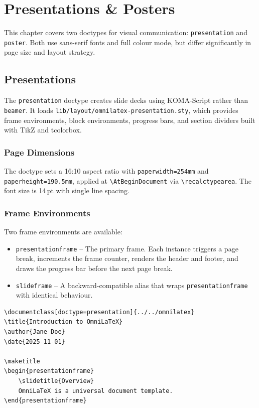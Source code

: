 \chapter{Presentations \& Posters}
\label{ch:visual}

This chapter covers two doctypes for visual communication:
\texttt{presentation} and \texttt{poster}.  Both use sans-serif fonts and
full colour mode, but differ significantly in page size and layout
strategy.

\section{Presentations}
\label{sec:presentation}

The \texttt{presentation} doctype creates slide decks using KOMA-Script
rather than \texttt{beamer}.  It loads
\texttt{lib/layout/omnilatex-presentation.sty}, which provides frame
environments, block environments, progress bars, and section dividers
built with TikZ and tcolorbox.

\subsection{Page Dimensions}

The doctype sets a 16:10 aspect ratio with
\texttt{paperwidth=254mm} and \texttt{paperheight=190.5mm}, applied at
\texttt{\textbackslash AtBeginDocument} via
\texttt{\textbackslash recalctypearea}.  The font size is 14\,pt with
single line spacing.

\subsection{Frame Environments}

Two frame environments are available:

\begin{itemize}
    \item \texttt{presentationframe} -- The primary frame.  Each instance
          triggers a page break, increments the frame counter, renders the
          header and footer, and draws the progress bar before the next
          page break.
    \item \texttt{slideframe} -- A backward-compatible alias that wraps
          \texttt{presentationframe} with identical behaviour.
\end{itemize}

\begin{verbatim}
\documentclass[doctype=presentation]{../../omnilatex}
\title{Introduction to OmniLaTeX}
\author{Jane Doe}
\date{2025-11-01}

\maketitle
\begin{presentationframe}
    \slidetitle{Overview}
    OmniLaTeX is a universal document template.
\end{presentationframe}

\end{verbatim}

